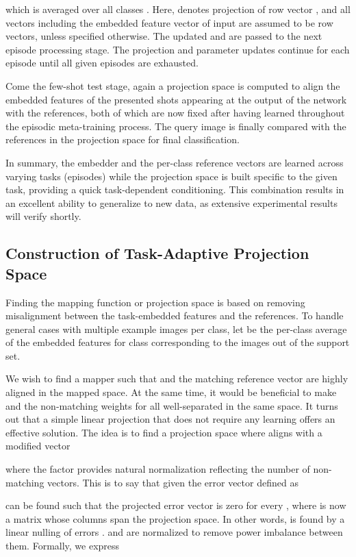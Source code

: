 \documentclass{article}
\begin{document}
which is averaged over all classes . 
Here,  denotes projection of row vector , and all vectors including the embedded feature vector  of input  are assumed to be row vectors, unless specified otherwise. 
The updated   and  are passed to the next episode processing stage. 
The projection and parameter updates continue for each episode until all given episodes are exhausted. 

Come the few-shot test stage, again a projection space is computed to align the embedded features of the presented shots appearing at the output of the network with the references, both of which are now fixed after having learned throughout the episodic meta-training process. The query image is finally compared with the references in the projection space for final classification. 


In summary, the embedder   and the per-class reference vectors  are learned across varying tasks (episodes)
while the projection space   is built specific to the given task, providing a quick task-dependent conditioning. This combination results in an excellent ability to generalize to new data, as extensive experimental results will verify shortly.


\subsection{Construction of Task-Adaptive Projection Space}
Finding the mapping function or projection space  is based on removing misalignment between the task-embedded features and the references. 
To handle general cases with multiple example images per class, let  be the per-class average of the embedded features for class  corresponding to the images out of the support set. 

We wish to find a mapper  such that  and the matching reference vector  are highly aligned in the mapped space. At the same time, it would be beneficial to make  and the non-matching weights  for all  well-separated in the same space. It turns out that a simple linear projection that does not require any learning offers an effective solution. The idea is to find a projection space where  aligns with a modified vector

where the factor  provides natural normalization reflecting the number of non-matching vectors. This is to say that given the error vector defined as 

 can be found such that the projected error vector  is zero for every , where
 is now a matrix whose columns span the projection space. In other words,  is found by a linear nulling of 
errors .  and  are normalized to remove power imbalance between them.
Formally, we express
\end{document}
